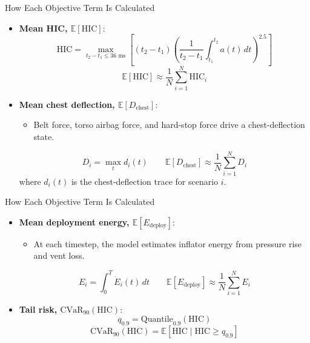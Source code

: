 \documentclass[aspectratio=169]{beamer}
\begin{document}
\begin{frame}{How Each Objective Term Is Calculated}
  \scriptsize
  \begin{itemize}
    \item \textbf{Mean HIC, \(\mathbb{E}[\mathrm{HIC}]\)}:
    \[
    \mathrm{HIC}=\max_{t_2-t_1 \le 36\text{ ms}}
    \left[
    (t_2-t_1)
    \left(
    \frac{1}{t_2-t_1}\int_{t_1}^{t_2} a(t)\,dt
    \right)^{2.5}
    \right]
    \]
    \[
    \mathbb{E}[\mathrm{HIC}] \approx \frac{1}{N}\sum_{i=1}^{N}\mathrm{HIC}_i
    \]

    \item \textbf{Mean chest deflection, \(\mathbb{E}[D_{\text{chest}}]\)}:
    \begin{itemize}
      \item Belt force, torso airbag force, and hard-stop force drive a chest-deflection state.
    \end{itemize}

    \[
    D_i = \max_t d_i(t)
    \qquad
    \mathbb{E}[D_{\text{chest}}] \approx \frac{1}{N}\sum_{i=1}^{N} D_i
    \]
    where \(d_i(t)\) is the chest-deflection trace for scenario \(i\).

  \end{itemize}
\end{frame}

\begin{frame}{How Each Objective Term Is Calculated}
  \scriptsize
  \begin{itemize}
    \item \textbf{Mean deployment energy, \(\mathbb{E}[E_{\text{deploy}}]\)}:
    \begin{itemize}
        \item At each timestep, the model estimates inflator energy from pressure rise and vent loss.
    \end{itemize}
    \[
    E_i = \int_0^T \dot{E}_i(t)\,dt
    \qquad
    \mathbb{E}[E_{\text{deploy}}] \approx \frac{1}{N}\sum_{i=1}^{N} E_i
    \]

    \item \textbf{Tail risk, \(\mathrm{CVaR}_{90}(\mathrm{HIC})\)}:
    \[
    q_{0.9} = \mathrm{Quantile}_{0.9}(\mathrm{HIC})
    \]
    \[
    \mathrm{CVaR}_{90}(\mathrm{HIC})
    =
    \mathbb{E}[\mathrm{HIC}\mid \mathrm{HIC}\ge q_{0.9}]
    \]
  \end{itemize}
\end{frame}
\end{document}
